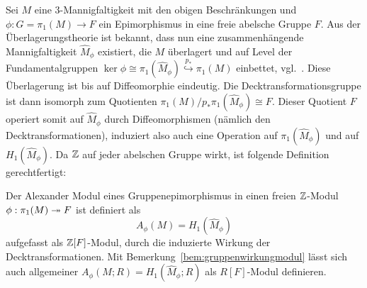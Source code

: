  


    	Sei $M$ eine 3-Mannigfaltigkeit mit den obigen Beschränkungen und $\phi: G=\pi_1(M) \to F$ ein Epimorphismus in eine freie abelsche Gruppe $F$. Aus der Überlagerungstheorie ist bekannt, dass nun eine zusammenhängende Mannigfaltigkeit $\hat M_\phi$ existiert, die $M$ überlagert und auf Level der Fundamentalgruppen $\ker \phi \cong \pi_1 (\hat M_\phi) \stackrel{p_*}{\hookrightarrow} \pi_1(M)$ einbettet, vgl.\ \cite[Kapitel~1.3]{Hatcher.2002}. Diese Überlagerung ist bis auf Diffeomorphie eindeutig. Die Decktransformationsgruppe ist dann isomorph zum Quotienten $\pi_1(M)/p_*\pi_1(\hat M_\phi) \cong F$. Dieser Quotient $F$ operiert somit auf $\hat M_\phi$ durch Diffeomorphismen (nämlich den Decktransformationen), induziert also auch eine Operation auf $\pi_1(\hat M_\phi)$ und auf $H_1(\hat M_\phi)$. Da $\mathbb{Z}$ auf jeder abelschen Gruppe wirkt, ist folgende Definition gerechtfertigt:
    	\begin{defn}
    		Der Alexander Modul eines Gruppenepimorphismus in einen freien $\mathbb{Z}$-Modul $\phi: \pi_1(M) \twoheadrightarrow F$ ist definiert als
    		\[
    			A_\phi(M) = H_1(\hat M_\phi)
    		\]
    		aufgefasst als $\mathbb{Z}[F]$-Modul, durch die induzierte Wirkung der Decktransformationen. Mit Bemerkung~\ref{bem:gruppenwirkungmodul} lässt sich auch allgemeiner $A_\phi(M;R)= H_1(\hat M_\phi;R)$ als $R[F]$-Modul definieren.
    	\end{defn}

